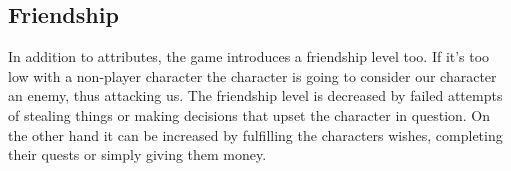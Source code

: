 \documentclass[10pt,twoside,english,a4paper]{article}
\begin{document}
   \subsection{Friendship}
In addition to attributes, the game introduces a friendship level too. If it's too low with a non-player character the character is going to consider our character an enemy, thus attacking us. The friendship level is decreased by failed attempts of stealing things or making decisions that upset the character in question. On the other hand it can be increased by fulfilling the characters wishes, completing their quests or simply giving them money.



\end{document}
